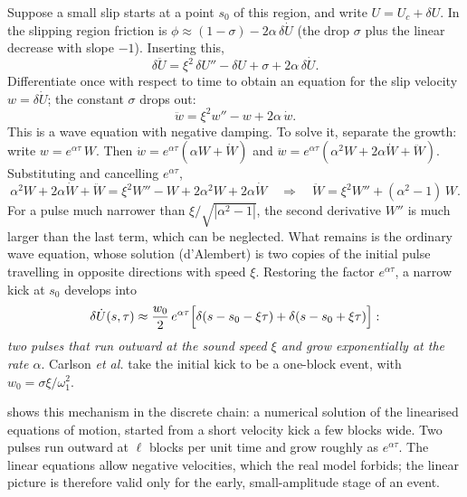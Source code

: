 Suppose a small slip starts at a point $s_0$ of this region, and write $U = U_c + \delta U$. In the slipping region friction is
$\phi\approx(1-\sigma) - 2\alpha\,\delta\dot U$ (the drop $\sigma$ plus the linear decrease with slope $-1$). Inserting this,
\begin{equation}
  \delta\ddot U = \xi^2\,\delta U'' - \delta U + \sigma + 2\alpha\,\delta\dot U .
\end{equation}
Differentiate once with respect to time to obtain an equation for the slip velocity $w = \delta\dot U$; the constant $\sigma$ drops out:
\begin{equation}
  \ddot w = \xi^2 w'' - w + 2\alpha\,\dot w .
  \label{eq:telegraph}
\end{equation}
This is a wave equation with negative damping. To solve it, separate the growth: write $w = e^{\alpha\tau}\,W$. Then
$\dot w = e^{\alpha\tau}(\alpha W + \dot W)$ and $\ddot w = e^{\alpha\tau}(\alpha^2W + 2\alpha\dot W + \ddot W)$. Substituting and
cancelling $e^{\alpha\tau}$,
\begin{equation}
  \alpha^2W + 2\alpha\dot W + \ddot W = \xi^2W'' - W + 2\alpha^2W + 2\alpha\dot W
  \quad\Longrightarrow\quad
  \ddot W = \xi^2W'' + (\alpha^2-1)\,W .
\end{equation}
For a pulse much narrower than $\xi/\sqrt{|\alpha^2-1|}$, the second derivative $W''$ is much larger than the last term, which can be
neglected. What remains is the ordinary wave equation, whose solution (d'Alembert) is two copies of the initial pulse travelling in
opposite directions with speed $\xi$. Restoring the factor $e^{\alpha\tau}$, a narrow kick at $s_0$ develops into
\begin{equation}
  \delta\dot U(s,\tau) \approx \frac{w_0}{2}\,e^{\alpha\tau}\Bigl[\delta(s-s_0-\xi\tau) + \delta(s-s_0+\xi\tau)\Bigr]:
  \label{eq:pulses}
\end{equation}
\emph{two pulses that run outward at the sound speed $\xi$ and grow exponentially at the rate $\alpha$}. Carlson \emph{et al.} take the
initial kick to be a one-block event, with $w_0 = \sigma\xi/\omega_1^2$.

 shows this mechanism in the discrete chain: a numerical solution of the linearised equations of motion, started from a
short velocity kick a few blocks wide. Two pulses run outward at $\ell$ blocks per unit time and grow roughly as $e^{\alpha\tau}$. The
linear equations allow negative velocities, which the real model forbids; the linear picture is therefore valid only for the early,
small-amplitude stage of an event.

